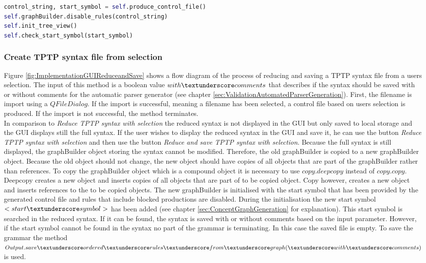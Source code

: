 \begin{lstlisting}[language=Python, basicstyle=\scriptsize	,caption= Reduce TPTP syntax with selection,label= lst:ImplementationGUIReduceTPTPSelection]
control_string, start_symbol = self.produce_control_file()
self.graphBuilder.disable_rules(control_string)
self.init_tree_view()
self.check_start_symbol(start_symbol)
\end{lstlisting}

\subsubsection{Create \ac{TPTP} syntax file from selection}\label{sec:ImplementationGUICreateTPTPFromSelection}

Figure \ref{fig:ImplementationGUIReduceandSave} shows a flow diagram of the process of reducing and saving a \ac{TPTP} syntax file from a users selection.
The input of this method is a boolean value $with\textunderscore comments$ that describes if the syntax should be saved with or without comments for the automatic parser generator (see chapter \ref{sec:ValidationAutomatedParserGeneration}). 
First, the filename is import using a $QFileDialog$.
If the import is successful, meaning a filename has been selected, a control file based on users selection is produced. If the import is not successful, the method terminates. \\
In comparison to \textit{Reduce \ac{TPTP} syntax with selection} the reduced syntax is not displayed in the GUI but only saved to local storage and the GUI displays still the full syntax. If the user wishes to display the reduced syntax in the GUI and save it, he can use the button \textit{Reduce \ac{TPTP} syntax with selection} and then use the button \textit{Reduce and save \ac{TPTP} syntax with selection}.
Because the full syntax is still displayed, the graphBuilder object storing the syntax cannot be modified. Therefore, the old graphBuilder is copied to a new graphBuilder object. Because the old object should not change, the new object should have copies of all objects that are part of the graphBuilder rather than references.
To copy the graphBuilder object which is a compound object it is necessary to use $copy.deepcopy$ instead of $copy.copy$. Deepcopy creates a new object and inserts copies of all objects that are part of to be copied object. Copy however, creates a new object and inserts references to the to be copied objects. 
The new graphBuilder is initialised with the start symbol that has been provided by the generated control file and rules that include blocked productions are disabled. During the initialisation the new start symbol $<start\textunderscore symbol>$ has been added (see chapter \ref{sec:ConceptGraphGeneration} for explanation). This start symbol is searched in the reduced syntax. If it can be found, the syntax is saved with or without comments based on the input parameter. However, if the start symbol cannot be found in the syntax no part of the grammar is terminating. In this case the saved file is empty. To save the grammar the method $Output.save\textunderscore ordered\textunderscore rules\textunderscore from\textunderscore graph(\textunderscore with\textunderscore comments)$ is used.

